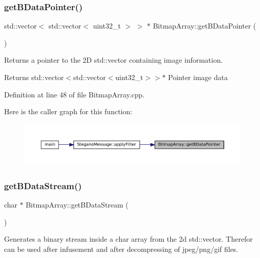 \subsubsection{\texorpdfstring{getBDataPointer()}{getBDataPointer()}}
{\footnotesize\ttfamily std\+::vector$<$ std\+::vector$<$ uint32\+\_\+t $>$ $>$ $\ast$ Bitmap\+Array\+::get\+B\+Data\+Pointer (\begin{DoxyParamCaption}{ }\end{DoxyParamCaption})}



Returns a pointer to the 2D std\+::vector containing image information. 

\begin{DoxyReturn}{Returns}
std\+::vector$<$std\+::vector$<$uint32\+\_\+t$>$$>$$\ast$ Pointer image data 
\end{DoxyReturn}


Definition at line 48 of file Bitmap\+Array.\+cpp.

Here is the caller graph for this function\+:
\nopagebreak
\begin{figure}[H]
\begin{center}
\leavevmode
\includegraphics[width=350pt]{classBitmapArray_ab914d6282460b386b2b5f936190487a2_icgraph}
\end{center}
\end{figure}
\mbox{\label{classBitmapArray_a7fe807ebdb5c41d3196440fab1ae3621}} 
\subsubsection{\texorpdfstring{getBDataStream()}{getBDataStream()}}
{\footnotesize\ttfamily char $\ast$ Bitmap\+Array\+::get\+B\+Data\+Stream (\begin{DoxyParamCaption}{ }\end{DoxyParamCaption})}



Generates a binary stream inside a char array from the 2d std\+::vector. Therefor can be used after infusement and after decompressing of jpeg/png/gif files. 

